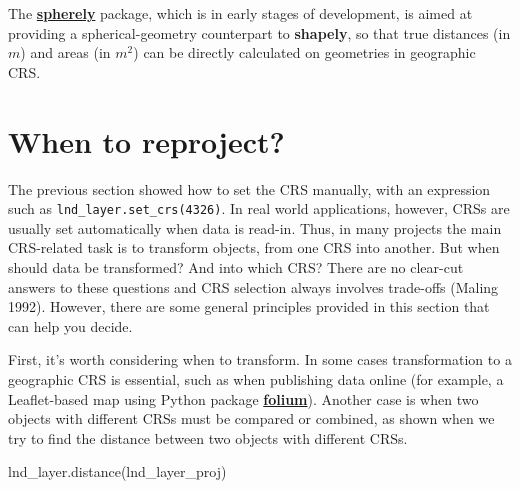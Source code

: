 \documentclass[
  letterpaper,
]{krantz}
\newenvironment{Shaded}{\begin{snugshade}}{\end{snugshade}}
\newcommand{\NormalTok}[1]{\textcolor[rgb]{0.00,0.23,0.31}{#1}}
\begin{document}
\begin{tcolorbox}[enhanced jigsaw, title=\textcolor{quarto-callout-note-color}{\faInfo}\hspace{0.5em}{Note}, arc=.35mm, toprule=.15mm, titlerule=0mm, colframe=quarto-callout-note-color-frame, breakable, toptitle=1mm, bottomtitle=1mm, rightrule=.15mm, colbacktitle=quarto-callout-note-color!10!white, leftrule=.75mm, left=2mm, bottomrule=.15mm, opacityback=0, coltitle=black, opacitybacktitle=0.6, colback=white]

The \href{https://github.com/benbovy/spherely}{\textbf{spherely}}
package, which is in early stages of development, is aimed at providing
a spherical-geometry counterpart to \textbf{shapely}, so that true
distances (in \(m\)) and areas (in \(m^2\)) can be directly calculated
on geometries in geographic CRS.

\end{tcolorbox}

\section{When to reproject?}\label{sec-when-to-reproject}

The previous section showed how to set the CRS manually, with an
expression such as \texttt{lnd\_layer.set\_crs(4326)}. In real world
applications, however, CRSs are usually set automatically when data is
read-in. Thus, in many projects the main CRS-related task is to
transform objects, from one CRS into another. But when should data be
transformed? And into which CRS? There are no clear-cut answers to these
questions and CRS selection always involves trade-offs (Maling 1992).
However, there are some general principles provided in this section that
can help you decide.

First, it's worth considering when to transform. In some cases
transformation to a geographic CRS is essential, such as when publishing
data online (for example, a Leaflet-based map using Python package
\href{https://python-visualization.github.io/folium/latest/}{\textbf{folium}}).
Another case is when two objects with different CRSs must be compared or
combined, as shown when we try to find the distance between two objects
with different CRSs.

\begin{Shaded}
\begin{Highlighting}[]
\NormalTok{lnd\_layer.distance(lnd\_layer\_proj)}
\end{Highlighting}
\end{Shaded}
\end{document}

